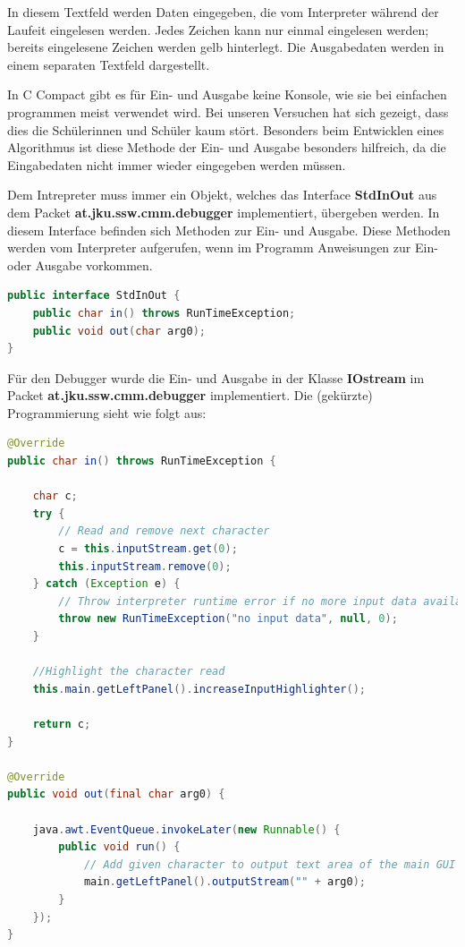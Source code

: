 In diesem Textfeld werden Daten eingegeben, die vom Interpreter während der Laufeit eingelesen werden. Jedes Zeichen kann nur einmal eingelesen werden; bereits eingelesene Zeichen werden gelb hinterlegt. Die Ausgabedaten werden in einem separaten Textfeld dargestellt.

In C Compact gibt es für Ein- und Ausgabe keine Konsole, wie sie bei einfachen programmen meist verwendet wird. Bei unseren Versuchen hat sich gezeigt, dass dies die Schülerinnen und Schüler kaum stört. Besonders beim Entwicklen eines Algorithmus ist diese Methode der Ein- und Ausgabe besonders hilfreich, da die Eingabedaten nicht immer wieder eingegeben werden müssen.

Dem Intrepreter muss immer ein Objekt, welches das Interface \textbf{StdInOut} aus dem Packet \textbf{at.jku.ssw.cmm.debugger} implementiert, übergeben werden. In diesem Interface befinden sich Methoden zur Ein- und Ausgabe. Diese Methoden werden vom Interpreter aufgerufen, wenn im Programm Anweisungen zur Ein- oder Ausgabe vorkommen.

\begin{lstlisting}[language=JAVA]
public interface StdInOut {
	public char in() throws RunTimeException;
	public void out(char arg0);
}
\end{lstlisting}

Für den Debugger wurde die Ein- und Ausgabe in der Klasse \textbf{IOstream} im Packet \textbf{at.jku.ssw.cmm.debugger} implementiert. Die (gekürzte) Programmierung sieht wie folgt aus:

\begin{lstlisting}[language=JAVA]
@Override
public char in() throws RunTimeException {

	char c;
	try {
		// Read and remove next character
		c = this.inputStream.get(0);
		this.inputStream.remove(0);
	} catch (Exception e) {
		// Throw interpreter runtime error if no more input data available
		throw new RunTimeException("no input data", null, 0);
	}
	
	//Highlight the character read
	this.main.getLeftPanel().increaseInputHighlighter();
	
	return c;
}

@Override
public void out(final char arg0) {

	java.awt.EventQueue.invokeLater(new Runnable() {
		public void run() {
			// Add given character to output text area of the main GUI
			main.getLeftPanel().outputStream("" + arg0);
		}
	});
}
\end{lstlisting}

